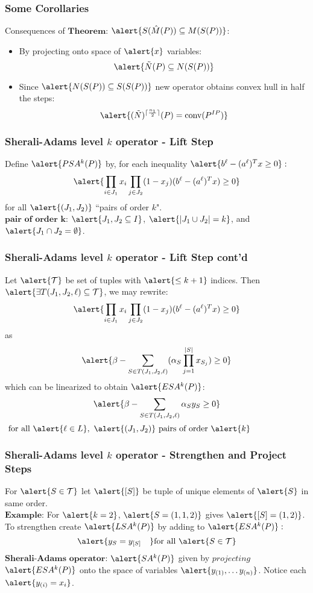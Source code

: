 \documentclass{beamer}
\DeclarePairedDelimiter{\ceil}{\lceil}{\rceil}
\DeclareMathOperator{\conv}{conv}
\begin{document}
\begin{frame}
\frametitle{Some Corollaries}
Consequences of $\textbf{Theorem:}$ $\alert{S(\hat{M}(P)) \subseteq M(S(P))}$:
\begin{itemize}
\item By projecting onto space of $\alert{x}$ variables: $$\alert{\tilde{N}(P) \subseteq N(S(P))}$$
\item Since $\alert{N(S(P)) \subseteq S(S(P))}$ new operator obtains convex hull in half the steps: $$\alert{(\tilde{N})^{\ceil{\frac{n_1}{2}}}(P) = \conv(P^{IP})}$$
\end{itemize}
\end{frame}

\begin{frame}
\frametitle{Sherali-Adams level $k$ operator - Lift Step}
Define $\alert{PSA^k(P)}$ by, for each inequality $\alert{b^\ell - (a^\ell)^Tx \geq 0}:$
$$\alert{\prod_{i \in J_1} x_i \prod_{j \in J_2} (1 - x_j) (b^\ell - (a^\ell)^Tx) \geq 0}$$
for all $\alert{(J_1, J_2)}$ ``pairs of order $k$".\\
$\textbf{pair of order k:}$ $\alert{J_1, J_2 \subseteq I}$, $\alert{|J_1 \cup J_2| = k}$, and $\alert{J_1 \cap J_2 = \emptyset}$.
\end{frame}

\begin{frame}
\frametitle{Sherali-Adams level $k$ operator - Lift Step cont'd}
Let $\alert{\mathcal{T}}$ be set of tuples with $\alert{\leq k+1}$ indices. Then $\alert{\exists T(J_1,J_2,\ell) \subseteq \mathcal{T}}$, we may rewrite:
$$\alert{\prod_{i \in J_1} x_i \prod_{j \in J_2} (1 - x_j) (b^\ell - (a^\ell)^Tx) \geq 0}$$
as
$$ \alert{\beta - \sum_{S \in T(J_1, J_2,\ell)} (\alpha_S \prod_{j=1}^{|S|} x_{S_j}) \geq 0}$$
which can be linearized to obtain $\alert{ESA^k(P)}$:
$$\alert{\beta -\sum_{S \in T(J_1, J_2,\ell)} \alpha_S y_S \geq 0} $$
$\text{ for all } \alert{\ell \in L},\ \alert{(J_1, J_2)} \text{ pairs of order } \alert{k}$
\end{frame}

\begin{frame}
\frametitle{Sherali-Adams level $k$ operator - Strengthen and Project Steps}
For $\alert{S \in \mathcal{T}}$ let $\alert{[S]}$ be tuple of unique elements of $\alert{S}$ in same order.\\
$\textbf{Example:}$ For $\alert{k=2}$, $\alert{S = (1,1,2)}$ gives $\alert{[S] = (1,2)}$.\\
To strengthen create $\alert{LSA^k(P)}$ by adding to $\alert{ESA^k(P)}:$
$$\alert{y_S = y_{[S]} \quad} \text{for all } \alert{S \in \mathcal{T}}$$
$\textbf{Sherali-Adams operator:}$ $\alert{SA^k(P)}$ given by $\textit{projecting}$ $\alert{ESA^k(P)}$ onto the space of variables $\alert{y_{(1)} ,\dots y_{(n)}}$. Notice each $\alert{y_{(i)} = x_i}$.
\end{frame}
\end{document}
